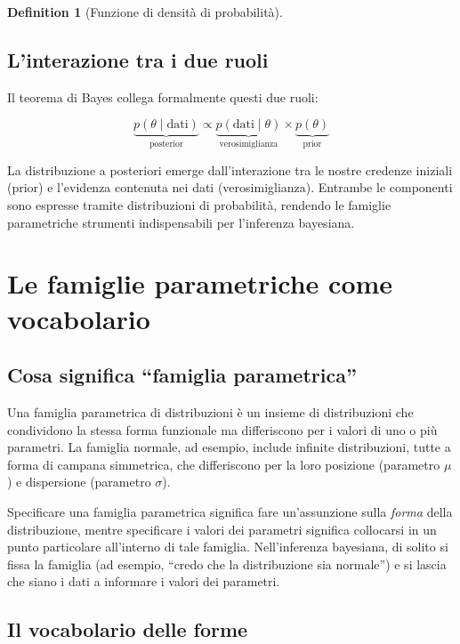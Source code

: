 \documentclass[
  letterpaper,
  DIV=11,
  numbers=noendperiod,
  oneside]{scrreprt}
\theoremstyle{definition}
\theoremstyle{plain}
\theoremstyle{definition}
\newtheorem{definition}{Definition}[chapter]
\theoremstyle{remark}
\begin{document}
\begin{definition}[Funzione di densità di
probabilità]
\subsection{L'interazione tra i due
ruoli}\label{linterazione-tra-i-due-ruoli}

Il teorema di Bayes collega formalmente questi due ruoli:

\[
\underbrace{p(\theta \mid \text{dati})}_{\text{posterior}} \propto \underbrace{p(\text{dati} \mid \theta)}_{\text{verosimiglianza}} \times \underbrace{p(\theta)}_{\text{prior}}
\]

La distribuzione a posteriori emerge dall'interazione tra le nostre
credenze iniziali (prior) e l'evidenza contenuta nei dati
(verosimiglianza). Entrambe le componenti sono espresse tramite
distribuzioni di probabilità, rendendo le famiglie parametriche
strumenti indispensabili per l'inferenza bayesiana.

\section{Le famiglie parametriche come
vocabolario}\label{le-famiglie-parametriche-come-vocabolario}

\subsection{Cosa significa ``famiglia
parametrica''}\label{cosa-significa-famiglia-parametrica}

Una famiglia parametrica di distribuzioni è un insieme di distribuzioni
che condividono la stessa forma funzionale ma differiscono per i valori
di uno o più parametri. La famiglia normale, ad esempio, include
infinite distribuzioni, tutte a forma di campana simmetrica, che
differiscono per la loro posizione (parametro \(\mu\)) e dispersione
(parametro \(\sigma\)).

Specificare una famiglia parametrica significa fare un'assunzione sulla
\emph{forma} della distribuzione, mentre specificare i valori dei
parametri significa collocarsi in un punto particolare all'interno di
tale famiglia. Nell'inferenza bayesiana, di solito si fissa la famiglia
(ad esempio, ``credo che la distribuzione sia normale'') e si lascia che
siano i dati a informare i valori dei parametri.

\subsection{Il vocabolario delle
forme}\label{il-vocabolario-delle-forme}


\end{definition}
\end{document}
